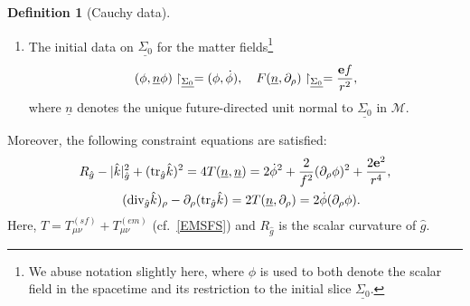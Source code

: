 \documentclass[10pt, reqno]{amsart}
\theoremstyle{definition}
\newtheorem{definition}[theorem]{Definition}
\theoremstyle{remark}
\numberwithin{equation}{section}
\newcommand{\rd}{\partial}
\newcommand{\0}{\emptyset}
\newcommand{\Sgm}{\Sigma}
\newcommand{\f}{\frac}
\begin{document}
\begin{definition}[Cauchy data]
\begin{enumerate}
\item The initial data on $\underline{\Sgm_{0}}$ for the matter fields\footnote{We abuse notation slightly here, where $\phi$ is used to both denote the scalar field in the spacetime and its restriction to the initial slice $\underline{\Sgm_{0}}$.}
$$(\phi, \underline{n} \phi)\restriction_{\underline{\Sgm_{0}}}=(\phi, \dot{\phi}),\quad F(\underline{n}, \rd_\rho)\restriction_{\underline{\Sgm_{0}}}=\f{{\bf e}f}{r^2},$$
where $\underline{n}$ denotes the unique future-directed unit normal to $\underline{\Sgm_0}$ in $\mathcal M$.
\end{enumerate}
Moreover, the following constraint equations are satisfied: 
\begin{gather}
R_{\hat{g}}-|\hat{k}|^2_{\hat{g}}+(\mbox{tr}_{\hat{g}}\hat{k})^2=4T(\underline{n}, \underline{n})=2\dot{\phi}^2+\f{2}{f^2}(\rd_\rho\phi)^2+\f{2{\bf e}^2}{r^4},\label{ham.con}\\
\quad(\mbox{div}_{\hat{g}} \hat{k})_\rho-\rd_{\rho}(\mbox{tr}_{\hat{g}} \hat{k})=2T(\underline{n}, \rd_\rho)=2\dot{\phi}(\rd_{\rho}\phi).\label{mom.con}
\end{gather}
Here, $T = T^{(sf)}_{\mu\nu}+T^{(em)}_{\mu\nu}$ (cf.~\eqref{EMSFS}) and $R_{\hat{g}}$ is the scalar curvature of $\hat{g}$.
\end{definition}
\end{document}
